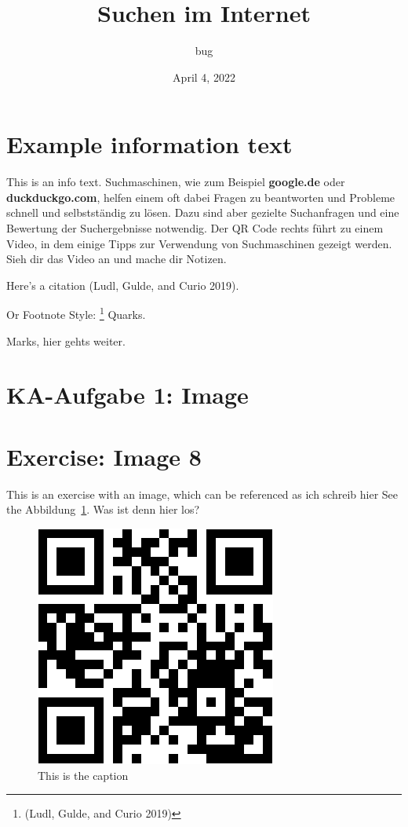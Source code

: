 \documentclass[12pt]{scrartcl}
\title{Suchen im Internet}
\author{bug}
\date{April 4, 2022}
\newcommand{\marginexercise}{\protect\reversemarginpar\protect\marginnote{\hfill\Large\faIcon{pencil-alt}}}
\newcommand{\margininfo}{\protect\reversemarginpar\protect\marginnote{\hfill\Large\faIcon[regular]{lightbulb}}}
\begin{document}
\hypertarget{example-information-text}{%
\section{Example information text\margininfo}\label{example-information-text}}

This is an info text. Suchmaschinen, wie zum Beispiel \textbf{google.de}
oder \textbf{duckduckgo.com}, helfen einem oft dabei Fragen zu
beantworten und Probleme schnell und selbstständig zu lösen. Dazu sind
aber gezielte Suchanfragen und eine Bewertung der Suchergebnisse
notwendig. Der QR Code rechts führt zu einem Video, in dem einige Tipps
zur Verwendung von Suchmaschinen gezeigt werden. Sieh dir das Video an
und mache dir Notizen.

Here's a citation (Ludl, Gulde, and Curio 2019).

Or Footnote Style: \footnote{(Ludl, Gulde, and Curio 2019)} Quarks.

Marks, hier gehts weiter.

\hypertarget{asdsad}{%
\section{KA-Aufgabe 1: Image}\label{asdsad}}

\hypertarget{exercise-image}{%
\section{Exercise: Image\marginexercise\hfill\normalsize{} 8}\label{exercise-image}}

This is an exercise with an image, which can be referenced as ich
schreib hier See the Abbildung~\ref{fig:qrcode}. Was ist denn hier los?

\begin{figure}
\hypertarget{fig:qrcode}{%
\centering
\includegraphics{qrcodeYouTubeVideo.png}
\caption{This is the caption}\label{fig:qrcode}
}
\end{figure}
\end{document}
